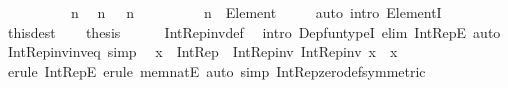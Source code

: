 \begin{isabellebody}
%
\isadelimproof
%
\endisadelimproof
%
\isatagproof
{}\isamarkupfalse%
\ {\isacharminus}{\kern0pt}\isanewline
\ \ \isacommand{{\isacharbraceleft}{\kern0pt}}\isamarkupfalse%
\isanewline
\ \ \ \ \isamarkupfalse%
\ n\ \isamarkupfalse%
\ {\isachardoublequoteopen}n\ {\isasymin}\ {\isasymnat}{\isachardoublequoteclose}\ {\isachardoublequoteopen}n\ {\isasymnoteq}\ {}{\isachardoublequoteclose}\isanewline
\ \ \ \ \isamarkupfalse%
\ \isamarkupfalse%
\ {\isachardoublequoteopen}n\ {\isacharcolon}{\kern0pt}\ Element\ {\isacharparenleft}{\kern0pt}{\isasymnat}\ {\isasymsetminus}\ {\isacharbraceleft}{\kern0pt}{}{\isacharbraceright}{\kern0pt}{\isacharparenright}{\kern0pt}{\isachardoublequoteclose}\ \isamarkupfalse%
\ {\isacharparenleft}{\kern0pt}auto\ intro{\isacharcolon}{\kern0pt}\ ElementI{\isacharparenright}{\kern0pt}\isanewline
\ \ \isacommand{{\isacharbraceright}{\kern0pt}}\isamarkupfalse%
\isanewline
\ \ \isamarkupfalse%
\ this{\isacharbrackleft}{\kern0pt}dest{\isacharbrackright}{\kern0pt}\isanewline
\ \ \isamarkupfalse%
\ {\isacharquery}{\kern0pt}thesis\isanewline
\ \ \ \ \isamarkupfalse%
\ Int{\isacharunderscore}{\kern0pt}Rep{\isacharunderscore}{\kern0pt}inv{\isacharunderscore}{\kern0pt}def\ \isamarkupfalse%
\ {\isacharparenleft}{\kern0pt}intro\ Dep{\isacharunderscore}{\kern0pt}fun{\isacharunderscore}{\kern0pt}typeI{\isacharcomma}{\kern0pt}\ elim\ Int{\isacharunderscore}{\kern0pt}RepE{\isacharparenright}{\kern0pt}\ auto\isanewline
{}\isamarkupfalse%
%
\endisatagproof
{\isafoldproof}%
%
\isadelimproof
\isanewline
%
\endisadelimproof
\isanewline
{}\isamarkupfalse%
\ Int{\isacharunderscore}{\kern0pt}Rep{\isacharunderscore}{\kern0pt}inv{\isacharunderscore}{\kern0pt}inv{\isacharunderscore}{\kern0pt}eq\ {\isacharbrackleft}{\kern0pt}simp{\isacharbrackright}{\kern0pt}{\isacharcolon}{\kern0pt}\isanewline
\ \ {\isachardoublequoteopen}x\ {\isacharcolon}{\kern0pt}\ Int{\isacharunderscore}{\kern0pt}Rep\ {\isasymLongrightarrow}\ Int{\isacharunderscore}{\kern0pt}Rep{\isacharunderscore}{\kern0pt}inv\ {\isacharparenleft}{\kern0pt}Int{\isacharunderscore}{\kern0pt}Rep{\isacharunderscore}{\kern0pt}inv\ x{\isacharparenright}{\kern0pt}\ {\isacharequal}{\kern0pt}\ x{\isachardoublequoteclose}\isanewline
%
\isadelimproof
\ \ %
\endisadelimproof
%
\isatagproof
{}\isamarkupfalse%
\ {\isacharparenleft}{\kern0pt}erule\ Int{\isacharunderscore}{\kern0pt}RepE{\isacharcomma}{\kern0pt}\ erule\ mem{\isacharunderscore}{\kern0pt}natE{\isacharparenright}{\kern0pt}\ {\isacharparenleft}{\kern0pt}auto\ simp{\isacharcolon}{\kern0pt}\ Int{\isacharunderscore}{\kern0pt}Rep{\isacharunderscore}{\kern0pt}zero{\isacharunderscore}{\kern0pt}def{\isacharbrackleft}{\kern0pt}symmetric{\isacharbrackright}{\kern0pt}{\isacharparenright}{\kern0pt}%

\end{isabellebody}
